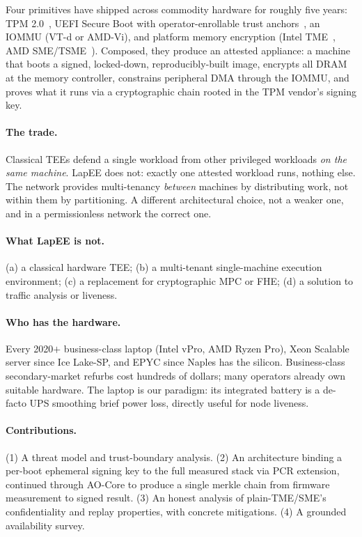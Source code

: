 \documentclass[10pt,a4paper]{article}
\begin{document}
Four primitives have shipped across commodity hardware for roughly five
years: TPM 2.0~\cite{tcg-tpm2}, UEFI Secure Boot with operator-enrollable
trust anchors~\cite{uefi-spec}, an IOMMU (VT-d or AMD-Vi), and platform
memory encryption (Intel TME~\cite{intel-tme}, AMD SME/TSME~\cite{amd-sme}).
Composed, they produce an attested appliance: a machine that boots a signed,
locked-down, reproducibly-built image, encrypts all DRAM at the memory
controller, constrains peripheral DMA through the IOMMU, and proves what it
runs via a cryptographic chain rooted in the TPM vendor's signing key.

\paragraph{The trade.} Classical TEEs defend a single workload from other
privileged workloads \emph{on the same machine}. LapEE does not: exactly one
attested workload runs, nothing else. The network provides multi-tenancy
\emph{between} machines by distributing work, not within them by
partitioning. A different architectural choice, not a weaker one, and in a
permissionless network the correct one.

\paragraph{What LapEE is not.} (a) a classical hardware TEE; (b) a
multi-tenant single-machine execution environment; (c) a replacement for
cryptographic MPC or FHE; (d) a solution to traffic analysis or liveness.

\paragraph{Who has the hardware.} Every 2020$+$ business-class laptop
(Intel vPro, AMD Ryzen Pro), Xeon Scalable server since Ice Lake-SP, and
EPYC since Naples has the silicon. Business-class secondary-market refurbs
cost hundreds of dollars; many operators already own suitable hardware. The
laptop is our paradigm: its integrated battery is a de-facto UPS smoothing
brief power loss, directly useful for node liveness.

\paragraph{Contributions.} (1) A threat model and trust-boundary analysis.
(2) An architecture binding a per-boot ephemeral signing key to the full
measured stack via PCR extension, continued through AO-Core to produce a
single merkle chain from firmware measurement to signed result.
(3) An honest analysis of plain-TME/SME's confidentiality and replay
properties, with concrete mitigations. (4) A grounded availability survey.
\end{document}
